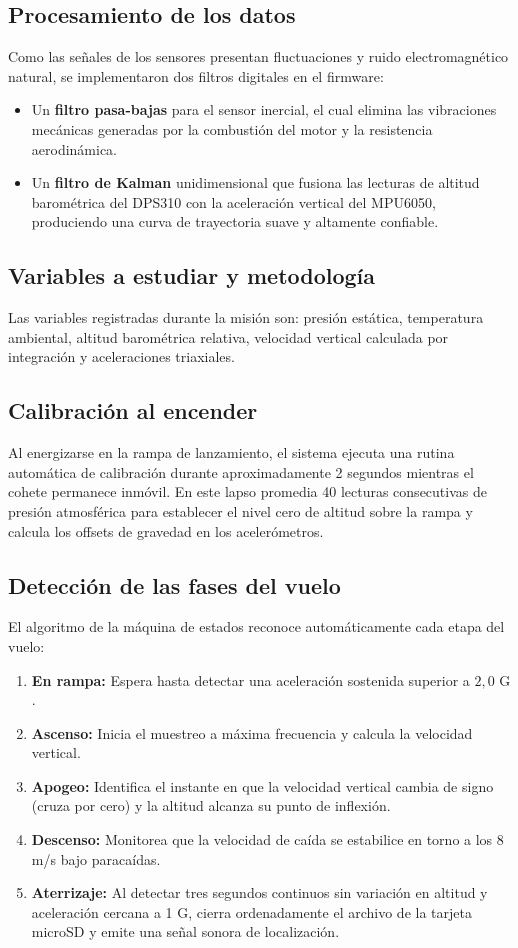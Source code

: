\subsection*{Procesamiento de los datos}
Como las señales de los sensores presentan fluctuaciones y ruido electromagnético natural, se implementaron dos filtros digitales en el firmware:
\begin{itemize}[leftmargin=1.5em]
    \item Un \textbf{filtro pasa-bajas} para el sensor inercial, el cual elimina las vibraciones mecánicas generadas por la combustión del motor y la resistencia aerodinámica.
    \item Un \textbf{filtro de Kalman} unidimensional que fusiona las lecturas de altitud barométrica del DPS310 con la aceleración vertical del MPU6050, produciendo una curva de trayectoria suave y altamente confiable.
\end{itemize}

\subsection*{Variables a estudiar y metodología}
Las variables registradas durante la misión son: presión estática, temperatura ambiental, altitud barométrica relativa, velocidad vertical calculada por integración y aceleraciones triaxiales. 

\subsection*{Calibración al encender}
Al energizarse en la rampa de lanzamiento, el sistema ejecuta una rutina automática de calibración durante aproximadamente 2 segundos mientras el cohete permanece inmóvil. En este lapso promedia 40 lecturas consecutivas de presión atmosférica para establecer el nivel cero de altitud sobre la rampa y calcula los offsets de gravedad en los acelerómetros.

\subsection*{Detección de las fases del vuelo}
El algoritmo de la máquina de estados reconoce automáticamente cada etapa del vuelo:
\begin{enumerate}[leftmargin=1.5em]
    \item \textbf{En rampa:} Espera hasta detectar una aceleración sostenida superior a $2,0\text{ G}$.
    \item \textbf{Ascenso:} Inicia el muestreo a máxima frecuencia y calcula la velocidad vertical.
    \item \textbf{Apogeo:} Identifica el instante en que la velocidad vertical cambia de signo (cruza por cero) y la altitud alcanza su punto de inflexión.
    \item \textbf{Descenso:} Monitorea que la velocidad de caída se estabilice en torno a los 8 m/s bajo paracaídas.
    \item \textbf{Aterrizaje:} Al detectar tres segundos continuos sin variación en altitud y aceleración cercana a 1 G, cierra ordenadamente el archivo de la tarjeta microSD y emite una señal sonora de localización.
\end{enumerate}

